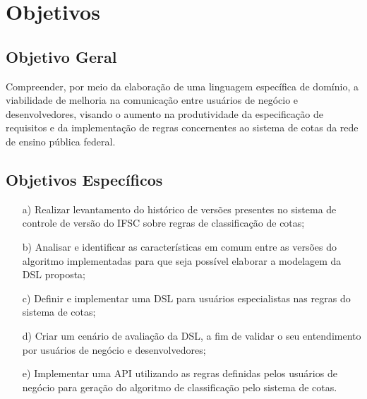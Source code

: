 \section{Objetivos}
\label{objetivos}

\subsection{Objetivo Geral}
\label{objetivogeral}

Compreender, por meio da elaboração de uma linguagem específica de domínio, a viabilidade de melhoria na comunicação entre usuários de negócio e desenvolvedores, visando o aumento na produtividade da especificação de requisitos e da implementação de regras concernentes ao sistema de cotas da rede de ensino pública federal. 


\subsection{Objetivos Específicos}
\label{objetivosespecificos}

\begin{enumerate}
    \item[a)] Realizar levantamento do histórico de versões presentes no sistema de controle de versão do \gls{IFSC} sobre regras de classificação de cotas;
    \item[b)] Analisar e identificar as características em comum entre as versões do algoritmo implementadas para que seja possível elaborar a modelagem da \gls{DSL} proposta;
    \item[c)] Definir e implementar uma \gls{DSL} para usuários especialistas nas regras do sistema de cotas;
    \item[d)] Criar um cenário de avaliação da DSL, a fim de validar o seu entendimento por usuários de negócio e desenvolvedores;
    \item[e)] Implementar uma \gls{API} utilizando as regras definidas pelos usuários de negócio para geração do algoritmo de classificação pelo sistema de cotas.
\end{enumerate}{}
